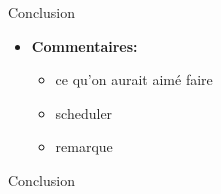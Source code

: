 \documentclass{beamer}
\begin{document}
\begin{frame}{Conclusion}
	\begin{itemize}
		\item \textbf{Commentaires:}
		\begin{itemize}
			\item ce qu'on aurait aimé faire
				\item scheduler
			\item remarque
		\end{itemize}
	\end{itemize}
\end{frame}

\begin{frame}{Conclusion}
\end{frame}
\end{document}
